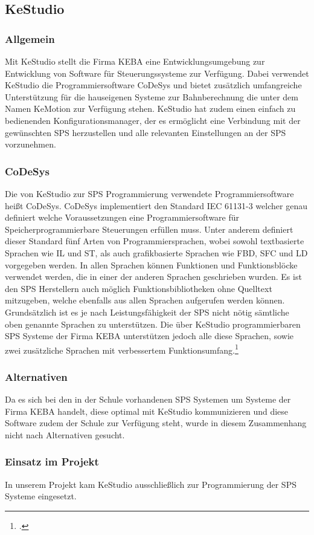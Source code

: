 \subsection{KeStudio}
\subsubsection{Allgemein}
Mit KeStudio stellt die Firma KEBA eine Entwicklungsumgebung zur Entwicklung von Software für Steuerungssysteme zur Verfügung. Dabei verwendet KeStudio die Programmiersoftware CoDeSys und bietet zusätzlich umfangreiche Unterstützung für die hauseigenen Systeme zur Bahnberechnung die unter dem Namen KeMotion zur Verfügung stehen. KeStudio hat zudem einen einfach zu bedienenden Konfigurationsmanager, der es ermöglicht eine Verbindung mit der gewünschten SPS herzustellen und alle relevanten Einstellungen an der SPS vorzunehmen.
\subsubsection{CoDeSys}
Die von KeStudio zur SPS Programmierung verwendete Programmiersoftware heißt CoDeSys. CoDeSys implementiert den Standard IEC 61131-3 welcher genau definiert welche Voraussetzungen eine Programmiersoftware für Speicherprogrammierbare Steuerungen erfüllen muss. Unter anderem definiert dieser Standard fünf Arten von Programmiersprachen, wobei sowohl textbasierte Sprachen wie IL und ST, als auch grafikbasierte Sprachen wie FBD, SFC und LD vorgegeben werden. In allen Sprachen können Funktionen und Funktionsblöcke verwendet werden, die in einer der anderen Sprachen geschrieben wurden. Es ist den SPS Herstellern auch möglich Funktionsbibliotheken ohne Quelltext mitzugeben, welche ebenfalls aus allen Sprachen aufgerufen werden können.
Grundsätzlich ist es je nach Leistungsfähigkeit der SPS nicht nötig sämtliche oben genannte Sprachen zu unterstützen. Die über KeStudio programmierbaren SPS Systeme der Firma KEBA unterstützen jedoch alle diese Sprachen, sowie zwei zusätzliche Sprachen mit verbessertem Funktionsumfang.\footcite[vgl.][]{codesys}
\subsubsection{Alternativen}
Da es sich bei den in der Schule vorhandenen SPS Systemen um Systeme der Firma KEBA handelt, diese optimal mit KeStudio kommunizieren und diese Software zudem der Schule zur Verfügung steht, wurde in diesem Zusammenhang nicht nach Alternativen gesucht.
\subsubsection{Einsatz im Projekt}
In unserem Projekt kam KeStudio ausschließlich zur Programmierung der SPS Systeme eingesetzt.
